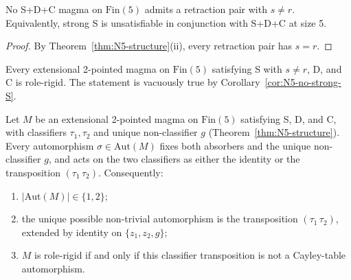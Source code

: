 \documentclass[sigconf,screen]{acmart}
\newcommand{\Fin}{\mathrm{Fin}}
\theoremstyle{remark}
\begin{document}
\begin{corollary}[Strong S is absent at $N\!=\!5$]
\label{cor:N5-no-strong-S}
No S+D+C magma on $\Fin(5)$ admits a retraction pair with $s \neq r$. Equivalently, strong S is unsatisfiable in conjunction with S+D+C at size 5.
\end{corollary}

\begin{proof}
By Theorem~\ref{thm:N5-structure}(ii), every retraction pair has $s = r$.
\end{proof}

\begin{corollary}[$N\!=\!5$ rigidity under strong S]
\label{cor:N5-rigid}
Every extensional 2-pointed magma on $\Fin(5)$ satisfying S with $s \neq r$, D, and C is role-rigid. The statement is vacuously true by Corollary~\ref{cor:N5-no-strong-S}.
\end{corollary}

\begin{theorem}[Mirror-row theorem at $N\!=\!5$]
\label{thm:mirror-row}
Let $M$ be an extensional 2-pointed magma on $\Fin(5)$ satisfying S, D, and C, with classifiers $\tau_1, \tau_2$ and unique non-classifier $g$ (Theorem~\ref{thm:N5-structure}). Every automorphism $\sigma \in \mathrm{Aut}(M)$ fixes both absorbers and the unique non-classifier $g$, and acts on the two classifiers as either the identity or the transposition $(\tau_1\,\tau_2)$. Consequently:
\begin{enumerate}
  \item $|\mathrm{Aut}(M)| \in \{1, 2\}$;
  \item the unique possible non-trivial automorphism is the transposition $(\tau_1\,\tau_2)$, extended by identity on $\{z_1, z_2, g\}$;
  \item $M$ is role-rigid if and only if this classifier transposition is not a Cayley-table automorphism.
\end{enumerate}
\end{theorem}
\end{document}
